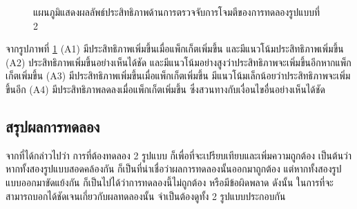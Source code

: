 \begin{figure}[h!]
    \centering
    \caption{แผนภูมิแสดงผลลัพธ์ประสิทธิภาพด้านการตรวจจับการโจมตีของการทดลองรูปแบบที่ 2}
    \label{img:graph_atk_2}
\end{figure}

จากรูปภาพที่ \ref{img:graph_atk_2} (A1) มีประสิทธิภาพเพิ่มขึ้นเมื่อแพ็กเก็ตเพิ่มขึ้น และมีแนวโน้มประสิทธิภาพเพิ่มขึ้น
(A2) ประสิทธิภาพเพิ่มขึ้นอย่างเห็นได้ชัด และมีแนวโน้มอย่างสูงว่าประสิทธิภาพจะเพิ่มขึ้นอีกหากแพ็กเก็ตเพิ่มขึ้น
(A3) มีประสิทธิภาพเพิ่มขึ้นเมื่อแพ็กเก็ตเพิ่มขึ้น มีแนวโน้มเล็กน้อยว่าประสิทธิภาพจะเพิ่มขึ้นอีก
(A4) มีประสิทธิภาพลดลงเมื่อแพ็กเก็ตเพิ่มขึ้น ซึ่งสวนทางกับเงื่อนไขอื่นอย่างเห็นได้ชัด
\\
\subsection{สรุปผลการทดลอง}

จากที่ได้กล่าวไปว่า การที่ต้องทดลอง 2 รูปแบบ ก็เพื่อที่จะเปรียบเทียบและเพิ่มความถูกต้อง
เป็นต้นว่า หากทั้งสองรูปแบบสอดคล้องกัน ก็เป็นที่น่าเชื่อว่าผลการทดลองนั้นออกมาถูกต้อง
แต่หากทั้งสองรูปแบบออกมาขัดแย้งกัน ก็เป็นไปได้ว่าการทดลองนี้ไม่ถูกต้อง หรือมีข้อผิดพลาด
ดังนั้น ในการที่จะสามารถบอกได้ชัดเจนเกี่ยวกับผลทดลองนั้น จำเป็นต้องดูทั้ง 2 รูปแบบประกอบกัน

